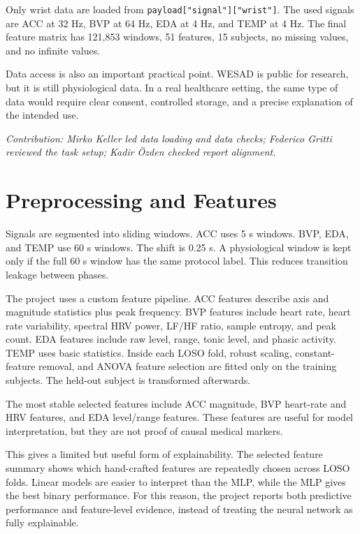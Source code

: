 \documentclass[10pt,a4paper,twocolumn]{article}
\newcommand{\sectioncontrib}[1]{\textit{Contribution: #1}}
\begin{document}
Only wrist data are loaded from \texttt{payload["signal"]["wrist"]}. The used signals are ACC at 32 Hz, BVP at 64 Hz, EDA at 4 Hz, and TEMP at 4 Hz. The final feature matrix has 121,853 windows, 51 features, 15 subjects, no missing values, and no infinite values.

Data access is also an important practical point. WESAD is public for research, but it is still physiological data. In a real healthcare setting, the same type of data would require clear consent, controlled storage, and a precise explanation of the intended use.

\sectioncontrib{Mirko Keller led data loading and data checks; Federico Gritti reviewed the task setup; Kadir {\"O}zden checked report alignment.}

\section{Preprocessing and Features}

Signals are segmented into sliding windows. ACC uses 5 s windows. BVP, EDA, and TEMP use 60 s windows. The shift is 0.25 s. A physiological window is kept only if the full 60 s window has the same protocol label. This reduces transition leakage between phases.

The project uses a custom feature pipeline. ACC features describe axis and magnitude statistics plus peak frequency. BVP features include heart rate, heart rate variability, spectral HRV power, LF/HF ratio, sample entropy, and peak count. EDA features include raw level, range, tonic level, and phasic activity. TEMP uses basic statistics. Inside each LOSO fold, robust scaling, constant-feature removal, and ANOVA feature selection are fitted only on the training subjects. The held-out subject is transformed afterwards.

The most stable selected features include ACC magnitude, BVP heart-rate and HRV features, and EDA level/range features. These features are useful for model interpretation, but they are not proof of causal medical markers.

This gives a limited but useful form of explainability. The selected feature summary shows which hand-crafted features are repeatedly chosen across LOSO folds. Linear models are easier to interpret than the MLP, while the MLP gives the best binary performance. For this reason, the project reports both predictive performance and feature-level evidence, instead of treating the neural network as fully explainable.
\end{document}
